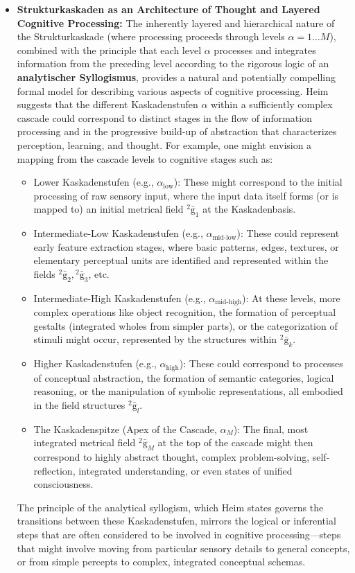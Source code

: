 \documentclass[12pt]{article}
\newcommand{\kompositionsfeld}{{}^2\bar{\mathrm{g}}}
\newcommand{\kaskadenstufe}{\alpha}
\begin{document}
\begin{itemize}
    \item \textbf{Strukturkaskaden as an Architecture of Thought and Layered Cognitive Processing:}
    The inherently layered and hierarchical nature of the Strukturkaskade (where processing proceeds through levels \( \kaskadenstufe=1 \dots M \)), combined with the principle that each level \( \kaskadenstufe \) processes and integrates information from the preceding level according to the rigorous logic of an \textbf{analytischer Syllogismus}, provides a natural and potentially compelling formal model for describing various aspects of cognitive processing. Heim suggests that the different Kaskadenstufen \( \kaskadenstufe \) within a sufficiently complex cascade could correspond to distinct stages in the flow of information processing and in the progressive build-up of abstraction that characterizes perception, learning, and thought. For example, one might envision a mapping from the cascade levels to cognitive stages such as:
    \begin{itemize}
        \item Lower Kaskadenstufen (e.g., \( \kaskadenstufe_{\text{low}} \)): These might correspond to the initial processing of raw sensory input, where the input data itself forms (or is mapped to) an initial metrical field \( \kompositionsfeld_1 \) at the Kaskadenbasis.
        \item Intermediate-Low Kaskadenstufen (e.g., \( \kaskadenstufe_{\text{mid-low}} \)): These could represent early feature extraction stages, where basic patterns, edges, textures, or elementary perceptual units are identified and represented within the fields \( \kompositionsfeld_2, \kompositionsfeld_3 \), etc.
        \item Intermediate-High Kaskadenstufen (e.g., \( \kaskadenstufe_{\text{mid-high}} \)): At these levels, more complex operations like object recognition, the formation of perceptual gestalts (integrated wholes from simpler parts), or the categorization of stimuli might occur, represented by the structures within \( \kompositionsfeld_k \).
        \item Higher Kaskadenstufen (e.g., \( \kaskadenstufe_{\text{high}} \)): These could correspond to processes of conceptual abstraction, the formation of semantic categories, logical reasoning, or the manipulation of symbolic representations, all embodied in the field structures \( \kompositionsfeld_l \).
        \item The Kaskadenspitze (Apex of the Cascade, \( \kaskadenstufe_M \)): The final, most integrated metrical field \( \kompositionsfeld_M \) at the top of the cascade might then correspond to highly abstract thought, complex problem-solving, self-reflection, integrated understanding, or even states of unified consciousness.
    \end{itemize}
    The principle of the analytical syllogism, which Heim states governs the transitions between these Kaskadenstufen, mirrors the logical or inferential steps that are often considered to be involved in cognitive processing—steps that might involve moving from particular sensory details to general concepts, or from simple percepts to complex, integrated conceptual schemas.


\end{itemize}
\end{document}
